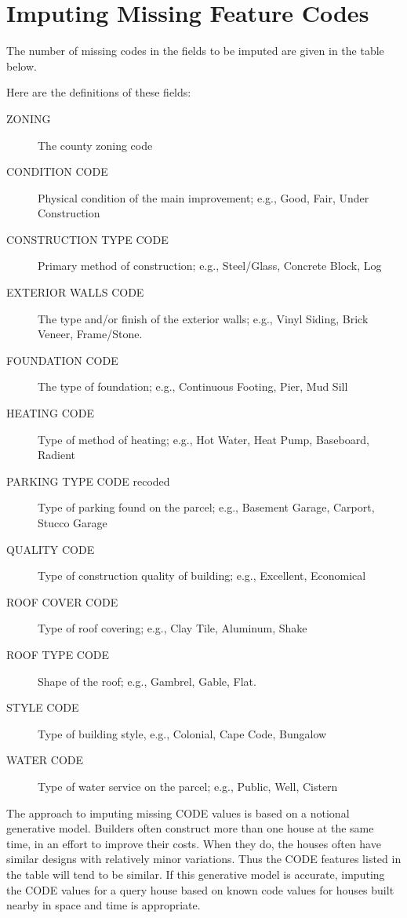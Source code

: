 \section{Imputing Missing Feature Codes}

The number of missing codes in the fields to be imputed are given in
the table below.

%

Here are the definitions of these fields:

\begin{description}
\item[ZONING] The county zoning code
\item[CONDITION CODE] Physical condition of the main improvement;
  e.g., Good, Fair, Under Construction
\item[CONSTRUCTION TYPE CODE] Primary method of construction; e.g.,
   Steel/Glass, Concrete Block, Log
\item[EXTERIOR WALLS CODE] The type and/or finish of the exterior
  walls; e.g., Vinyl Siding, Brick Veneer, Frame/Stone.
\item[FOUNDATION CODE] The type of foundation; e.g., Continuous
  Footing, Pier, Mud Sill
\item[HEATING CODE] Type of method of heating; e.g., Hot Water, Heat
  Pump, Baseboard, Radient
\item[PARKING TYPE CODE recoded] Type of parking found on the parcel;
  e.g., Basement Garage, Carport, Stucco Garage
\item[QUALITY CODE] Type of construction quality of building; e.g.,
  Excellent, Economical
\item[ROOF COVER CODE] Type of roof covering; e.g., Clay Tile,
  Aluminum, Shake
\item[ROOF TYPE CODE] Shape of the roof; e.g., Gambrel, Gable, Flat.
\item[STYLE CODE] Type of building style, e.g., Colonial, Cape Code, Bungalow
\item[WATER CODE] Type of water service on the parcel; e.g., Public,
  Well, Cistern
\end{description}

The approach to imputing missing CODE values is based on a notional
generative model. Builders often construct more than one house at the
same time, in an effort to improve their costs. When they do, the
houses often have similar designs with relatively minor
variations. Thus the CODE features listed in the table will tend to be
similar. If this generative model is accurate, imputing the CODE
values for a query house based on known code values for houses built
nearby in space and time is appropriate.

